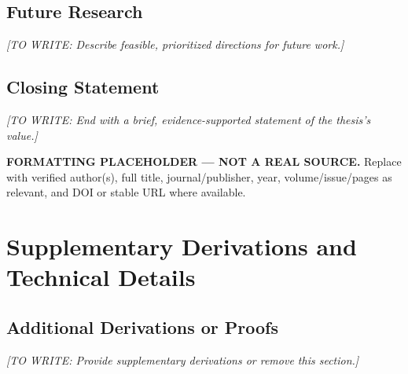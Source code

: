 \documentclass[12pt,a4paper,oneside]{report}
\newif\ifshowguidance
\newcommand{\Guide}[1]{%
  \ifshowguidance
  \begin{tcolorbox}[enhanced,breakable,colback=GuideBlue,
    colframe=GuideBorder,boxrule=0.5pt,arc=1mm,
    title={Writing guide --- replace with your research},
    colbacktitle=ThesisBlue,coltitle=white,fonttitle=\small\bfseries,
    before skip=10pt,after skip=10pt]
    \small #1
  \end{tcolorbox}
  \fi}
\newcommand{\Draft}[1]{\par\noindent\textit{[TO WRITE: #1]}\par}
\begin{document}
\section{Future Research}
\Guide{Prioritize a small set of specific next studies. Link each to a
limitation or open question and explain the method or evidence needed.
Avoid generic suggestions such as ``use more data'' without a rationale.}
\Draft{Describe feasible, prioritized directions for future work.}

\section{Closing Statement}
\Draft{End with a brief, evidence-supported statement of the thesis's value.}

\clearpage
\renewcommand{\bibname}{References}
{}
\begin{thebibliography}{99}
\textbf{FORMATTING PLACEHOLDER --- NOT A REAL SOURCE.}
Replace with verified author(s), full title, journal/publisher, year,
volume/issue/pages as relevant, and DOI or stable URL where available.
\end{thebibliography}

\appendix
\chapter{Supplementary Derivations and Technical Details}
\label{app:derivations}
\Guide{Include supporting material that would interrupt the main argument:
lengthy derivations, additional proofs, parameter details, supplementary
checks, or expanded technical documentation. Cite the appendix where it
becomes relevant in the main text. Necessary reasoning must remain in the
main thesis; appendices should not hide essential evidence.}
\section{Additional Derivations or Proofs}
\Draft{Provide supplementary derivations or remove this section.}
\end{document}
